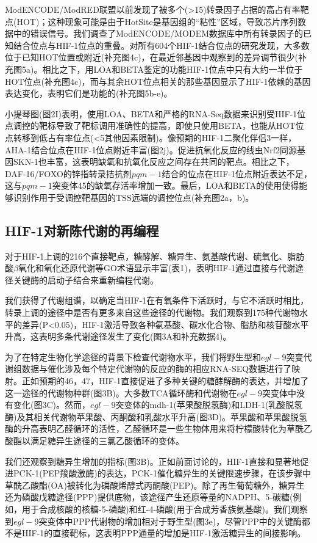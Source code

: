 \documentclass{ctexart}
\begin{document}
        ModENCODE/ModRED联盟以前发现了被多个(>15)转录因子占据的高占有率靶点(HOT)；这种现象可能是由于HotSite是基因组的“粘性”区域，导致芯片序列数据中的错误信号。我们调查了ModENCODE/MODEM数据库中所有转录因子的已知结合位点与HIF-1位点的重叠。对所有604个HIF-1结合位点的研究发现，大多数位于已知HOT位置或附近(补充图4c)，在最近邻基因中观察到的差异调节很少(补充图5a)。相比之下，用LOA和BETA鉴定的功能HIF-1位点中只有大约一半位于HOT位点(补充图4c)，而与其余HOT位点相关的那些基因显示了HIF-1依赖的基因表达变化，表明它们是功能的(补充图5b-e)。

        小提琴图(图2I)表明，使用LOA、BETA和严格的RNA-Seq数据来识别受HIF-1位点调控的靶标导致了靶标调用准确性的提高，即使只使用BETA，也能从HOT位点转移到低占有率位点(<5其他因素限制)。像预期的HIF-1二聚化伴侣3一样，AHA-1结合位点在HIF-1位点附近丰富(图2j)。促进抗氧化反应的线虫Nrf2同源基因SKN-1也丰富，这表明缺氧和抗氧化反应之间存在共同的靶点。相比之下，DAF-16/FOXO的锌指转录拮抗剂$pqm-1$结合的位点在HIF-1位点附近表达不足，这与$pqm-1$突变体45的缺氧存活率增加一致。最后，LOA和BETA的使用使得能够识别作用于受调控靶基因的TSS远端的调控位点(补充图2a，b)。

    \subsection{HIF-1对新陈代谢的再编程}

        对于HIF-1上调的216个直接靶点，糖酵解、糖异生、氨基酸代谢、硫氧化、脂肪酸$\beta$氧化和氧化还原代谢等GO术语显示丰富(表1)，表明HIF-1通过直接与代谢途径关键酶的启动子结合来重新编程代谢。

        我们获得了代谢组谱，以确定当HIF-1在有氧条件下活跃时，与它不活跃时相比，转录上调的途径中是否有更多来自这些途径的代谢物。我们观察到175种代谢物水平的差异(P<0.05)，HIF-1激活导致各种氨基酸、碳水化合物、脂肪和核苷酸水平升高，这表明多条代谢途径发生了变化(图3A和补充数据4)。

        为了在特定生物化学途径的背景下检查代谢物水平，我们将野生型和$egl-9$突变代谢组数据与催化涉及每个特定代谢物的反应的酶的相应RNA-SEQ数据进行了映射。正如预期的46，47，HIF-1直接促进了多种关键的糖酵解酶的表达，并增加了这一途径的代谢物种群(图3B)。大多数TCA循环酶和代谢物在$egl-9$突变体中没有变化(图3C)。然而，$egl-9$突变体的mdh-1(苹果酸脱氢酶)和LDH-1(乳酸脱氢酶)及其相关代谢物苹果酸、丙酮酸和乳酸水平升高(图3D)。苹果酸和苹果酸脱氢酶的升高表明乙醛循环的活性，乙醛循环是一些生物体用来将柠檬酸转化为草酰乙酸酯以满足糖异生途径的三氯乙酸循环的变体。

        我们还观察到糖异生增加的指标(图3B)。正如前面讨论的，HIF-1直接和显著地促进PCK-1(PEP羧酸激酶)的表达，PCK-1催化糖异生的关键限速步骤，在该步骤中草酰乙酸酯(OA)被转化为磷酸烯醇式丙酮酸(PEP)。除了再生葡萄糖外，糖异生还为磷酸戊糖途径(PPP)提供底物，该途径产生还原等量的NADPH、5-碳糖(例如，用于合成核酸的核糖-5-磷酸)和红-4-磷酸(用于合成芳香族氨基酸)。我们观察到$egl-9$突变体中PPP代谢物的增加相对于野生型(图3e)，尽管PPP中的关键酶都不是HIF-1的直接靶标，这表明PPP通量的增加是HIF-1激活糖异生的间接影响。
\end{document}
